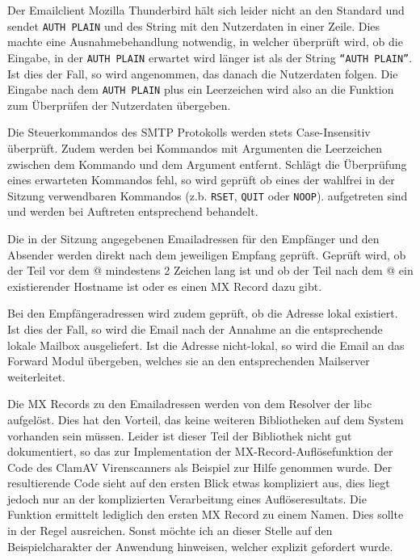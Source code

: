 \documentclass[final,a4paper,11pt,notitlepage,halfparskip]{scrreprt}
\begin{document}
Der Emailclient Mozilla Thunderbird hält sich leider nicht an den Standard und
sendet \texttt{AUTH PLAIN} und des String mit den Nutzerdaten in einer Zeile.
Dies machte eine Ausnahmebehandlung notwendig, in welcher überprüft wird, ob die
Eingabe, in der \texttt{AUTH PLAIN} erwartet wird länger ist als der String
\texttt{"`AUTH PLAIN"'}. Ist dies der Fall, so wird angenommen, das danach die
Nutzerdaten folgen. Die Eingabe nach dem \texttt{AUTH PLAIN} plus ein
Leerzeichen wird also an die Funktion zum Überprüfen der Nutzerdaten übergeben.

Die Steuerkommandos des SMTP Protokolls werden stets Case-Insensitiv überprüft.
Zudem werden bei Kommandos mit Argumenten die Leerzeichen zwischen dem Kommando
und dem Argument entfernt. Schlägt die Überprüfung eines erwarteten Kommandos
fehl, so wird geprüft ob eines der wahlfrei in der Sitzung verwendbaren
Kommandos (z.b. \texttt{RSET}, \texttt{QUIT} oder \texttt{NOOP}). aufgetreten
sind und werden bei Auftreten entsprechend behandelt.

Die in der Sitzung angegebenen Emailadressen für den Empfänger und den Absender
werden direkt nach dem jeweiligen Empfang geprüft. Geprüft wird, ob der Teil vor
dem @ mindestens 2 Zeichen lang ist und ob der Teil nach dem @ ein existierender
Hostname ist oder es einen MX Record dazu gibt. 

Bei den Empfängeradressen wird zudem geprüft, ob die Adresse lokal existiert.
Ist dies der Fall, so wird die Email nach der Annahme an die entsprechende
lokale Mailbox ausgeliefert. Ist die Adresse nicht-lokal, so wird die Email an
das Forward Modul übergeben, welches sie an den entsprechenden Mailserver
weiterleitet.

Die MX Records zu den Emailadressen werden von dem Resolver der libc aufgelöst.
Dies hat den Vorteil, das keine weiteren Bibliotheken auf dem System vorhanden
sein müssen. Leider ist dieser Teil der Bibliothek nicht gut dokumentiert, so
das zur Implementation der MX-Record-Auflösefunktion der Code des ClamAV
Virenscanners als Beispiel zur Hilfe genommen wurde. Der resultierende Code
sieht auf den ersten Blick etwas kompliziert aus, dies liegt jedoch nur an der
komplizierten Verarbeitung eines Auflöseresultats. Die Funktion ermittelt
lediglich den ersten MX Record zu einem Namen. Dies sollte in der Regel
ausreichen. Sonst möchte ich an dieser Stelle auf den Beispielcharakter der
Anwendung hinweisen, welcher explizit gefordert wurde.
\end{document}
